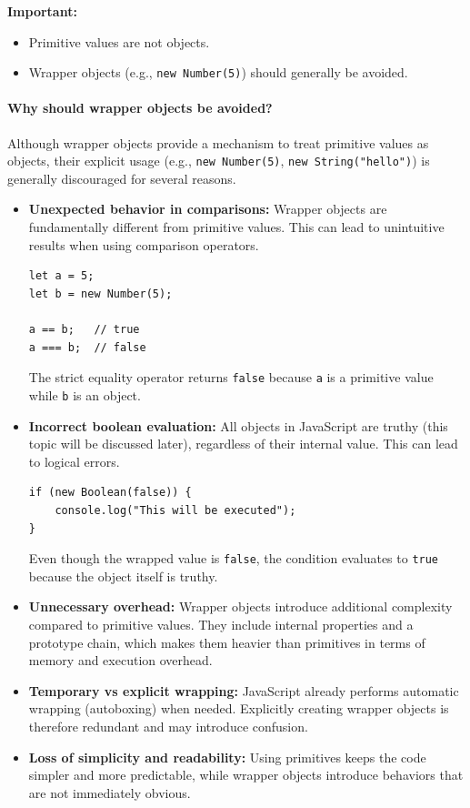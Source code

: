 \documentclass{scrbook}
\begin{document}
\textbf{Important:}
\begin{itemize}
    \item Primitive values are not objects.
    \item Wrapper objects (e.g., \texttt{new Number(5)}) should generally be avoided.
\end{itemize}

\paragraph{Why should wrapper objects be avoided?}

Although wrapper objects provide a mechanism to treat primitive values as objects, their explicit usage (e.g., \texttt{new Number(5)}, \texttt{new String("hello")}) is generally discouraged for several reasons.

\begin{itemize}
    \item \textbf{Unexpected behavior in comparisons:} Wrapper objects are fundamentally different from primitive values. This can lead to unintuitive results when using comparison operators.

\begin{lstlisting}
let a = 5;
let b = new Number(5);

a == b;   // true
a === b;  // false
\end{lstlisting}

The strict equality operator returns \texttt{false} because \texttt{a} is a primitive value while \texttt{b} is an object.

    \item \textbf{Incorrect boolean evaluation:} All objects in JavaScript are truthy (this topic will be discussed later), regardless of their internal value. This can lead to logical errors.

\begin{lstlisting}
if (new Boolean(false)) {
    console.log("This will be executed");
}
\end{lstlisting}

Even though the wrapped value is \texttt{false}, the condition evaluates to \texttt{true} because the object itself is truthy.

    \item \textbf{Unnecessary overhead:} Wrapper objects introduce additional complexity compared to primitive values. They include internal properties and a prototype chain, which makes them heavier than primitives in terms of memory and execution overhead.

    \item \textbf{Temporary vs explicit wrapping:} JavaScript already performs automatic wrapping (autoboxing) when needed. Explicitly creating wrapper objects is therefore redundant and may introduce confusion.

    \item \textbf{Loss of simplicity and readability:} Using primitives keeps the code simpler and more predictable, while wrapper objects introduce behaviors that are not immediately obvious.
\end{itemize}
\end{document}
